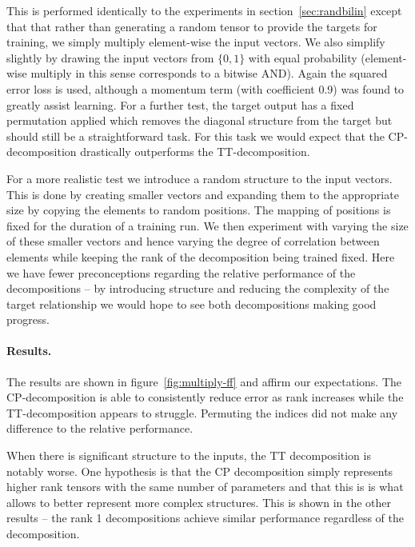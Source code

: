 This is performed identically to the experiments in section~\ref{sec:randbilin}
except that that rather than generating a random tensor to provide the targets for training,
we simply multiply element-wise the input vectors. We also simplify slightly by drawing the
input vectors from \(\{0,1\}\) with equal probability
(element-wise multiply in this sense corresponds to a bitwise AND). 
Again the squared error loss is used, although
a momentum term (with coefficient 0.9) was found to greatly assist learning.
For a further test, the target
output has a fixed permutation applied which removes the diagonal structure from the target but
should still be a straightforward task. For this task we would
expect that the CP-decomposition drastically outperforms the TT-decomposition.

For a more realistic test we introduce a random structure to the input vectors. This is done by
creating smaller vectors and expanding them to the appropriate size by copying the
elements to random positions. The mapping of positions is fixed for the duration of a training
run. We then experiment with varying the size of these smaller vectors and hence varying the
degree of correlation between elements
while keeping the rank of the decomposition being trained fixed. Here we have fewer
preconceptions regarding the relative performance of the decompositions -- by introducing structure
and reducing the complexity of the target relationship we would hope to see both decompositions making
good progress.

\paragraph{Results.}
The results are shown in figure~\ref{fig:multiply-ff}
and affirm our expectations. 
The CP-decomposition is able to consistently reduce error as rank increases
 while the TT-decomposition appears to struggle. Permuting the indices did not make any
 difference to the relative performance.

When there is significant structure to the inputs, the
TT decomposition is notably worse. One hypothesis is that the CP decomposition simply represents
higher rank tensors with the same number of parameters and that this is is what allows to better
represent more complex structures. This is shown in the other results -- the rank 1 decompositions
achieve similar performance regardless of the decomposition.

